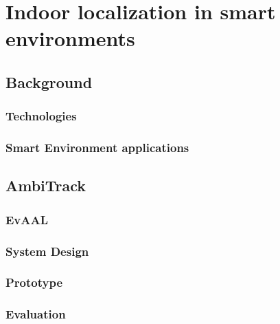 \chapter{Indoor localization in smart environments}
\section{Background}
\subsection{Technologies}
\subsection{Smart Environment applications}
\section{AmbiTrack}
\subsection{EvAAL}
\subsection{System Design}
\subsection{Prototype}
\subsection{Evaluation}